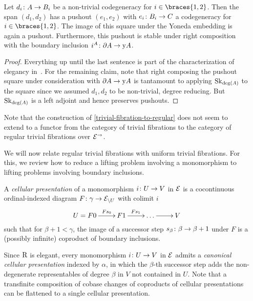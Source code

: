 \documentclass[reqno,10pt,a4paper,oneside,draft]{amsart}
\begin{document}
\begin{lemma}
\label{pushout-non-trivial-deg-boundary}
Let $d_i \colon A \to B_i$ be a non-trivial codegeneracy for $i \in \braces{1, 2}$.
Then the span $(d_1, d_2)$ has a pushout $(e_1, e_2)$ with $e_i \colon B_i \to C$ a codegeneracy for $i \in \braces{1, 2}$.
The image of this square under the Yoneda embedding is again a pushout.
Furthermore, this pushout is stable under right composition with the boundary inclusion $i^A \colon \partial A \to \mathrm{y} A$.
\end{lemma}

\begin{proof}
Everything up until the last sentence is part of the characterization of elegancy in~\cite[Proposition~3.8]{bergner-rezk-elegant}.
For the remaining claim, note that right composing the pushout square under consideration with $\partial A \to \mathrm{y} A$ is tantamount to applying $\operatorname{Sk}_{\deg(A)}$ to the square since we assumed $d_1, d_2$ to be non-trivial, \ie degree reducing.
But $\operatorname{Sk}_{\deg(A)}$ is a left adjoint and hence preserves pushouts.
\end{proof}

Note that the construction of \cref{trivial-fibration-to-regular} does not seem to extend to a functor from the category of trivial fibrations to the category of regular trivial fibrations over $\mathcal{E}^{\to}$.

\medskip

We will now relate regular trivial fibrations with uniform trivial fibrations.
For this, we review how to reduce a lifting problem involving a monomorphism to lifting problems involving boundary inclusions.

\begin{definition} A \emph{cellular presentation} of a monomorphism $i \colon U \to V$ in $\mathcal{E}$ is a cocontinuous ordinal-indexed diagram $F \colon \gamma \to \mathcal{E}_{\backslash U}$ with colimit $i$
\[
\xymatrix{
  U = F 0
  \ar[r]^-{F s_0}
&
  F 1
  \ar[r]^{F s_1}
&
  \ldots
  \ar[r]
&
  V
}
\]
such that for $\beta + 1 < \gamma$, the image of a successor step $s_{\beta} \colon \beta \to \beta + 1$ under $F$ is a (possibly infinite) coproduct of boundary inclusions.
\end{definition}

Since $\mathrm{R}$ is elegant, every monomorphism $i \colon U \to V$ in $\mathcal{E}$ admits a \emph{canonical cellular presentation} indexed by $\alpha$, in which the $\beta$-th successor step adds the non-degenerate representables of degree $\beta$ in $V$ not contained in $U$.
Note that a transfinite composition of cobase changes of coproducts of cellular presentations can be flattened to a single cellular presentation.
\end{document}
